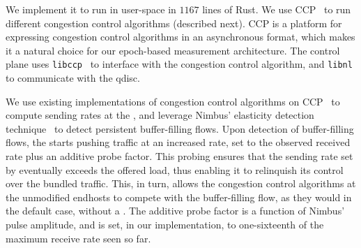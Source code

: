 
 We implement it to run in user-space in $1167$ lines of Rust.
We use CCP~\cite{ccp} to run different congestion control algorithms (described next). CCP is a platform for expressing congestion control algorithms in an asynchronous format, which makes it a natural choice for our epoch-based measurement architecture. The control plane uses \texttt{libccp}~\cite{ccp} to interface with the congestion control algorithm, and  \texttt{libnl} to communicate with the qdisc.

 We use existing implementations of congestion control algorithms on CCP~\cite{nimbus, copa, bbr} to compute sending rates at the \inbox, and leverage Nimbus' elasticity detection technique~\cite{nimbus} to detect persistent buffer-filling flows. Upon detection of buffer-filling flows, the \inbox  starts pushing traffic at an increased rate, set to the observed received rate plus an additive probe factor. This probing ensures that the sending rate set by \inbox eventually exceeds the offered load, thus enabling it to relinquish its control over the bundled traffic. This, in turn, allows the congestion control algorithms at the unmodified endhosts to compete with the buffer-filling flow, as they would in the default case, without a \name. The additive probe factor is a function of Nimbus' pulse amplitude, and is set, in our implementation, to one-sixteenth of the maximum receive rate seen so far.

